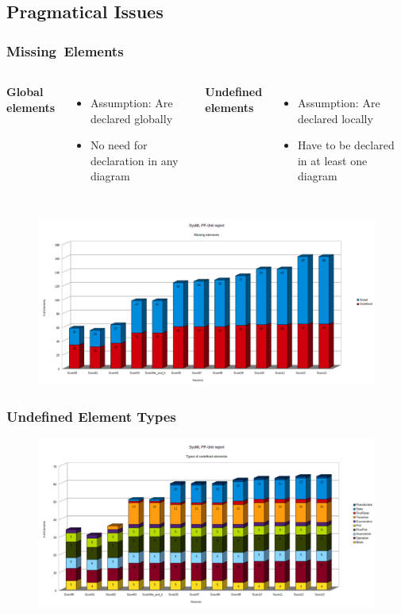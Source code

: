 \documentclass[10pt]{beamer}
\begin{document}
\subsection{Pragmatical Issues}
\begin{frame}
\frametitle{\glqq Missing\grqq\ Elements}
 \begin{columns}[t]
 \textbf{Global elements}
\begin{itemize}
  \item Assumption: Are declared globally
  \item No need for declaration in any diagram
\end{itemize}
 \textbf{Undefined elements}
\begin{itemize}
  \item Assumption: Are declared locally
  \item Have to be declared in at least one diagram
\end{itemize}
\end{columns}
\begin{center}
\begin{figure}%
\includegraphics[scale=0.25]{missingElements}\\
\end{figure}
\end{center}
\end{frame}
\begin{frame}
\frametitle{Undefined Element Types}
\begin{figure}%
\includegraphics[width=1.0\textwidth,height=0.9\textheight]{undefinedElementTypes}\\
\end{figure}
\end{frame}
\end{document}
